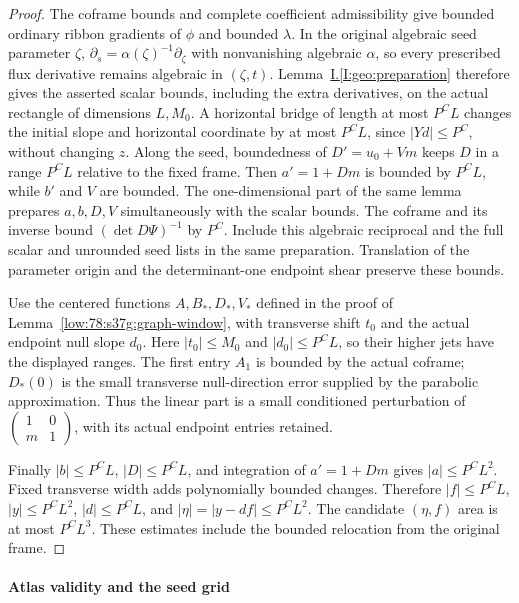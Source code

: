 \documentclass[11pt]{amsart}
\theoremstyle{definition}
\theoremstyle{remark}
\numberwithin{equation}{section}
\newcommand{\partIref}[1]{\hyperref[I:#1]{I.\ref*{I:#1}}}
\begin{document}
\begin{proof}
The coframe bounds and complete coefficient admissibility give bounded ordinary ribbon gradients of $\phi$ and bounded $\lambda$. In the original algebraic seed parameter $\zeta$, $\partial_s=\alpha(\zeta)^{-1}\partial_\zeta$ with nonvanishing algebraic $\alpha$, so every prescribed flux derivative remains algebraic in $(\zeta,t)$. Lemma~\partIref{geo:preparation} therefore gives the asserted scalar bounds, including the extra derivatives, on the actual rectangle of dimensions $L,M_0$. A horizontal bridge of length at most $P^CL$ changes the initial slope and horizontal coordinate by at most $P^CL$, since $|Yd|\le P^C$, without changing $z$. Along the seed, boundedness of $D'=u_0+Vm$ keeps $D$ in a range $P^CL$ relative to the fixed frame. Then $a'=1+Dm$ is bounded by $P^CL$, while $b'$ and $V$ are bounded. The one-dimensional part of the same lemma prepares $a,b,D,V$ simultaneously with the scalar bounds. The coframe and its inverse bound $(\det D\Psi)^{-1}$ by $P^C$. Include this algebraic reciprocal and the full scalar and unrounded seed lists in the same preparation. Translation of the parameter origin and the determinant-one endpoint shear preserve these bounds.

Use the centered functions $A,B_*,D_*,V_*$ defined in the proof of Lemma~\ref{low:78:s37g:graph-window}, with transverse shift $t_0$ and the actual endpoint null slope $d_0$. Here $|t_0|\le M_0$ and $|d_0|\le P^CL$, so their higher jets have the displayed ranges. The first entry $A_1$ is bounded by the actual coframe; $D_*(0)$ is the small transverse null-direction error supplied by the parabolic approximation. Thus the linear part is a small conditioned perturbation of $\left(\begin{smallmatrix}1&0\\m&1\end{smallmatrix}\right)$, with its actual endpoint entries retained.

Finally $|b|\le P^CL$, $|D|\le P^CL$, and integration of $a'=1+Dm$ gives $|a|\le P^CL^2$. Fixed transverse width adds polynomially bounded changes. Therefore $|f|\le P^CL$, $|y|\le P^CL^2$, $|d|\le P^CL$, and $|\eta|=|y-df|\le P^CL^2$. The candidate $(\eta,f)$ area is at most $P^CL^3$. These estimates include the bounded relocation from the original frame.
\end{proof}

\paragraph{Atlas validity and the seed grid}
\end{document}

